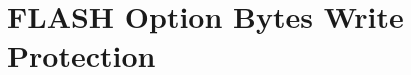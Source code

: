 \hypertarget{group___f_l_a_s_h_ex___option___bytes___write___protection}{}\section{F\+L\+A\+SH Option Bytes Write Protection}
\label{group___f_l_a_s_h_ex___option___bytes___write___protection}
